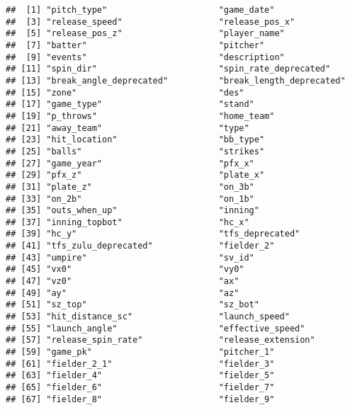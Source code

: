 \documentclass[]{article}
\begin{document}
\begin{verbatim}
##  [1] "pitch_type"                      "game_date"                      
##  [3] "release_speed"                   "release_pos_x"                  
##  [5] "release_pos_z"                   "player_name"                    
##  [7] "batter"                          "pitcher"                        
##  [9] "events"                          "description"                    
## [11] "spin_dir"                        "spin_rate_deprecated"           
## [13] "break_angle_deprecated"          "break_length_deprecated"        
## [15] "zone"                            "des"                            
## [17] "game_type"                       "stand"                          
## [19] "p_throws"                        "home_team"                      
## [21] "away_team"                       "type"                           
## [23] "hit_location"                    "bb_type"                        
## [25] "balls"                           "strikes"                        
## [27] "game_year"                       "pfx_x"                          
## [29] "pfx_z"                           "plate_x"                        
## [31] "plate_z"                         "on_3b"                          
## [33] "on_2b"                           "on_1b"                          
## [35] "outs_when_up"                    "inning"                         
## [37] "inning_topbot"                   "hc_x"                           
## [39] "hc_y"                            "tfs_deprecated"                 
## [41] "tfs_zulu_deprecated"             "fielder_2"                      
## [43] "umpire"                          "sv_id"                          
## [45] "vx0"                             "vy0"                            
## [47] "vz0"                             "ax"                             
## [49] "ay"                              "az"                             
## [51] "sz_top"                          "sz_bot"                         
## [53] "hit_distance_sc"                 "launch_speed"                   
## [55] "launch_angle"                    "effective_speed"                
## [57] "release_spin_rate"               "release_extension"              
## [59] "game_pk"                         "pitcher_1"                      
## [61] "fielder_2_1"                     "fielder_3"                      
## [63] "fielder_4"                       "fielder_5"                      
## [65] "fielder_6"                       "fielder_7"                      
## [67] "fielder_8"                       "fielder_9"                      

\end{verbatim}
\end{document}
